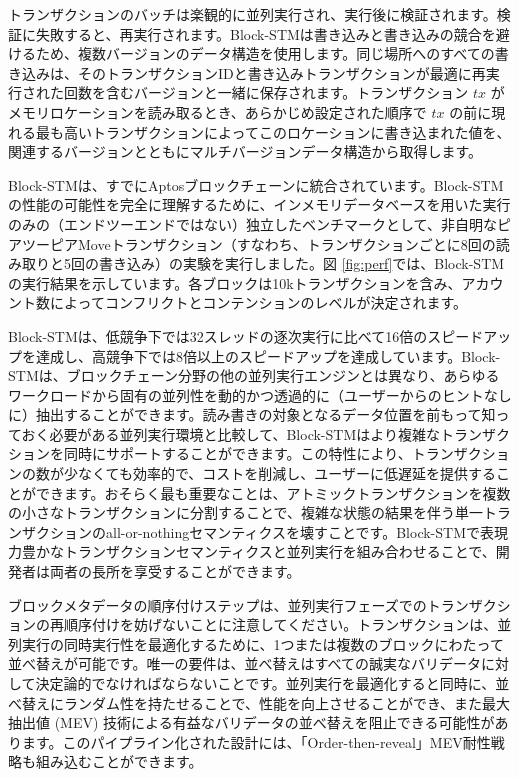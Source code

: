 \documentclass{article}
\begin{document}
トランザクションのバッチは楽観的に並列実行され、実行後に検証されます。検証に失敗すると、再実行されます。Block-STMは書き込みと書き込みの競合を避けるため、複数バージョンのデータ構造を使用します。同じ場所へのすべての書き込みは、そのトランザクションIDと書き込みトランザクションが最適に再実行された回数を含むバージョンと一緒に保存されます。トランザクション $tx$ がメモリロケーションを読み取るとき、あらかじめ設定された順序で $tx$ の前に現れる最も高いトランザクションによってこのロケーションに書き込まれた値を、関連するバージョンとともにマルチバージョンデータ構造から取得します。

Block-STMは、すでにAptosブロックチェーンに統合されています。Block-STMの性能の可能性を完全に理解するために、インメモリデータベースを用いた実行のみの（エンドツーエンドではない）独立したベンチマークとして、非自明なピアツーピアMoveトランザクション（すなわち、トランザクションごとに8回の読み取りと5回の書き込み）の実験を実行しました。図 \ref{fig:perf}では、Block-STMの実行結果を示しています。各ブロックは10kトランザクションを含み、アカウント数によってコンフリクトとコンテンションのレベルが決定されます。

Block-STMは、低競争下では32スレッドの逐次実行に比べて16倍のスピードアップを達成し、高競争下では8倍以上のスピードアップを達成しています。Block-STMは、ブロックチェーン分野の他の並列実行エンジンとは異なり、あらゆるワークロードから固有の並列性を動的かつ透過的に（ユーザーからのヒントなしに）抽出することができます。読み書きの対象となるデータ位置を前もって知っておく必要がある並列実行環境と比較して、Block-STMはより複雑なトランザクションを同時にサポートすることができます。この特性により、トランザクションの数が少なくても効率的で、コストを削減し、ユーザーに低遅延を提供することができます。おそらく最も重要なことは、アトミックトランザクションを複数の小さなトランザクションに分割することで、複雑な状態の結果を伴う単一トランザクションのall-or-nothingセマンティクスを壊すことです。Block-STMで表現力豊かなトランザクションセマンティクスと並列実行を組み合わせることで、開発者は両者の長所を享受することができます。

ブロックメタデータの順序付けステップは、並列実行フェーズでのトランザクションの再順序付けを妨げないことに注意してください。トランザクションは、並列実行の同時実行性を最適化するために、1つまたは複数のブロックにわたって並べ替えが可能です。唯一の要件は、並べ替えはすべての誠実なバリデータに対して決定論的でなければならないことです。並列実行を最適化すると同時に、並べ替えにランダム性を持たせることで、性能を向上させることができ、また最大抽出値 (MEV) 技術による有益なバリデータの並べ替えを阻止できる可能性があります。このパイプライン化された設計には、「Order-then-reveal」MEV耐性戦略も組み込むことができます。
\end{document}

